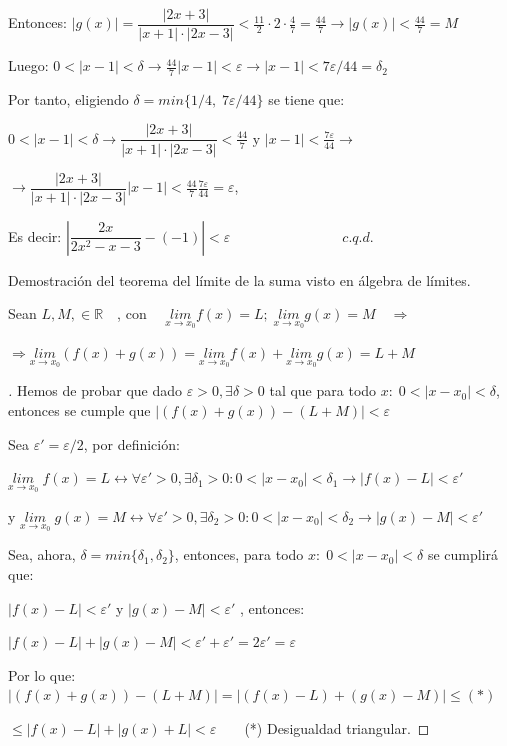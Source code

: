 \begin{ejem}
		Entonces: $|g(x)|= \dfrac {|2x+3|}{|x+1|\cdot |2x-3|}< \frac {11}2 \cdot 2 \cdot \frac 4 7 = \frac {44} 7 \to |g(x)|<\frac {44} 7 =M$
		
		 Luego: $0<|x-1|<\delta \to \frac {44} 7 |x-1|< \varepsilon \to |x-1|<7\varepsilon/44=\delta_2$
		
		 Por tanto, eligiendo $\delta=min\{1/4,\; 7\varepsilon/44\}$ se tiene que:
		
		 $0<|x-1|<\delta \to \dfrac{|2x+3|}{|x+1|\cdot |2x-3|}<\frac {44}{7} \mbox { y } |x-1|<\frac {7\varepsilon}{44} \to $
		
		 $\to \dfrac{|2x+3|}{|x+1|\cdot |2x-3|}|x-1|<\frac {44}{7} \frac {7\varepsilon}{44}=\varepsilon$,
		
		 
		\hspace{20mm}Es decir: $ \left| \dfrac{2x}{2x^2-x-3}-(-1)  \right|<\varepsilon \qquad \qquad \qquad \qquad c.q.d.$
		\end{ejem}
		
		
		\begin{ejem} Demostración del teorema del límite de la suma visto en álgebra de límites.
		
		Sean $L, M,  \in \mathbb R \quad $, con $\quad \underset {x \to x_0}{lim}{f(x)}=L; \; \underset {x \to x_0}{lim}{g(x)}=M \quad \Rightarrow$

		
		$\Rightarrow \underset {x\to x_0}{lim}{(f(x)+g(x))}=\underset {x\to x_0}{lim}{f(x)}+\underset {x\to x_0}{lim}{g(x)}=L+M$
			
		\end{ejem}

		\begin{proof}[]%
		Hemos de probar que dado $\varepsilon >0, \exists \delta>0$ tal que para todo $x: \; 0<|x-x_0|<\delta $, entonces se cumple que $| \left( f(x)+g(x) \right)- (L+M)|<\varepsilon$	
		
		Sea $\varepsilon'=\varepsilon/2$, por definición:
		
		 $\underset{x\to x_0}{lim}\;{f(x)}=L \leftrightarrow \forall \varepsilon'>0, \exists \delta_1>0: 0<|x-x_0|<\delta_1 \to |f(x)-L|<\varepsilon'$
		 
		 y $\underset{x\to x_0}{lim}\;{g(x)}=M \leftrightarrow \forall \varepsilon'>0, \exists \delta_2>0: 0<|x-x_0|<\delta_2 \to |g(x)-M|<\varepsilon'$
		 
		 Sea, ahora, $\delta=min\{\delta_1, \delta_2 \}$, entonces, para todo $x:\; 0<|x-x_0|<\delta$ se cumplirá que:
		 
		 $|f(x)-L|<\varepsilon'$ y $|g(x)-M|<\varepsilon'$ , entonces:
		 
		 $|f(x)-L|+|g(x)-M|<\varepsilon'+\varepsilon'=2\varepsilon'=\varepsilon$ 
		 
		 Por lo que: $|(f(x)+g(x))-(L+M)|= |(f(x)-L)+(g(x)-M)|\le(*)$
		 
		 $\le |f(x)-L|+|g(x)+L|<\varepsilon\qquad $(*) Desigualdad triangular.
		\end{proof}
		
